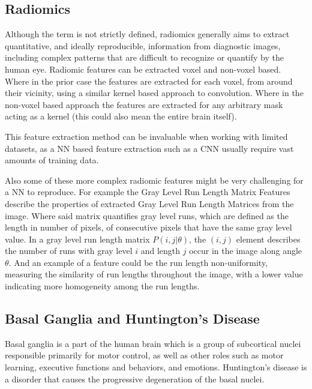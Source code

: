 \subsection{Radiomics}

Although the term is not strictly defined, radiomics generally aims to extract quantitative, and ideally reproducible, information from diagnostic images, including complex patterns that are difficult to recognize or quantify by the human eye. \cite{radio} Radiomic features can be extracted voxel and non-voxel based. Where in the prior case the features are extracted for each voxel, from around their vicinity, using a similar kernel based approach to convolution. Where in the non-voxel based approach the features are extracted for any arbitrary mask acting as a kernel (this could also mean the entire brain itself).\par
This feature extraction method can be invaluable when working with limited datasets, as a \ac{NN} based feature extraction such as a \ac{CNN} usually require vast amounts of training data.\par
Also some of these more complex radiomic features might be very challenging for a \ac{NN} to reproduce. For example the Gray Level Run Length Matrix Features describe the properties of extracted Gray Level Run Length Matrices from the image. Where said matrix quantifies gray level runs, which are defined as the length in number of pixels, of consecutive pixels that have the same gray level value. In a gray level run length matrix $P(i,j|\theta)$, the $(i,j)$ element describes the number of runs with gray level $i$ and length $j$ occur in the image along angle $\theta$. And an example of a feature could be the run length non-uniformity, measuring the similarity of run lengths throughout the image, with a lower value indicating more homogeneity among the run lengths. \cite{radio2}

\subsection{Basal Ganglia and Huntington’s Disease}

Basal ganglia is a part of the human brain which is a group of subcortical nuclei responsible primarily for motor control, as well as other roles such as motor learning, executive functions and behaviors, and emotions. \cite{basal} Huntington’s disease is a disorder that causes the progressive degeneration of the basal nuclei. \cite{hunting}\par

